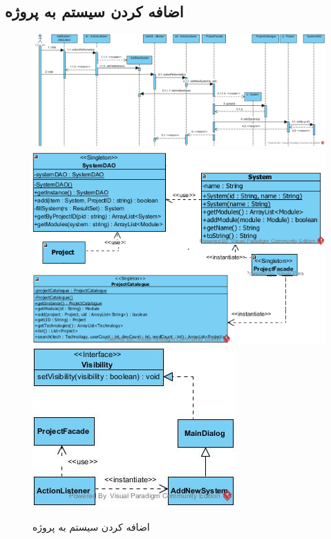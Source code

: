 \begin{landscape}
\newpage
\section{اضافه کردن سیستم به پروژه}
\begin{figure}[H]
	\centering
	\includegraphics[scale=0.55]{img/sequence-design/AddSystemToProject}
	\includegraphics[scale=0.6]{img/sequence-design/AddSystemToProjectC}
	\includegraphics[scale=0.6]{img/sequence-design/AddSystemToProjectUI}
	\caption{اضافه کردن سیستم به پروژه}
\end{figure}

\newpage

\end{landscape}
